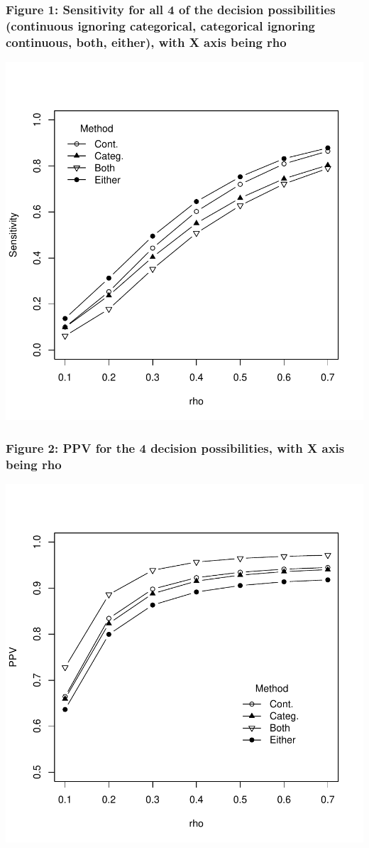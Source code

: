 \documentclass{article}
\begin{document}
\subsubsection*{Figure 1: Sensitivity for all 4 of the decision possibilities (continuous ignoring categorical, categorical ignoring continuous, both, either), with X axis being rho}

\includegraphics{accuracy_category_withrr-dd}

\subsubsection*{Figure 2: PPV for the 4 decision possibilities, with X axis being rho}

\includegraphics{accuracy_category_withrr-ee}
\end{document}
